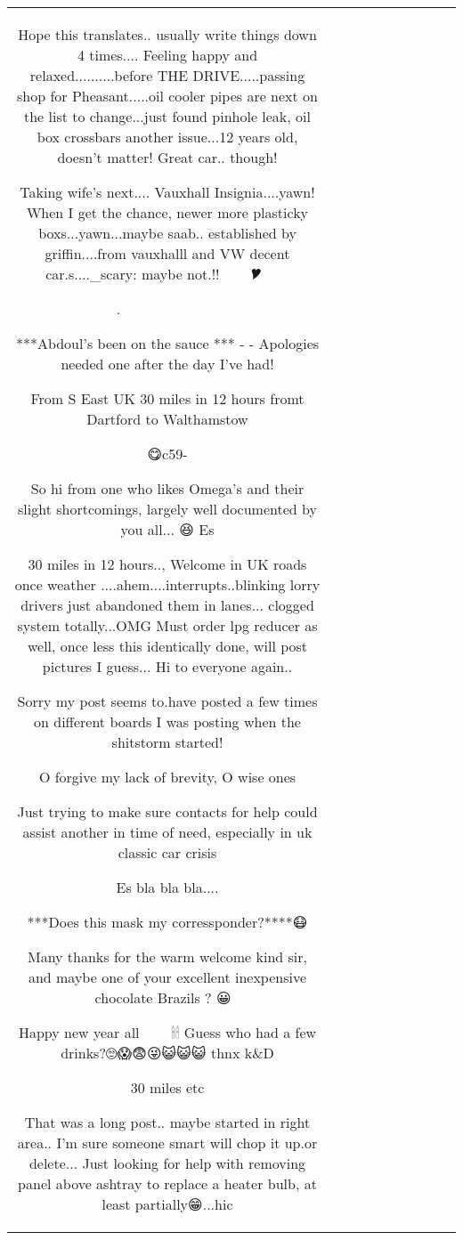 \begin{table}[h!]
\begin{tabular}{|c|c|c|c|c|c|c|c|c|c|}
{Hope this translates.. usually write things down 4 times.... Feeling happy and relaxed..........before THE DRIVE.....passing shop for Pheasant.....oil cooler pipes are next on the list to change...just found pinhole leak, oil box crossbars another issue...12 years old, doesn't matter! Great car.. though! 

Taking wife's next.... Vauxhall Insignia....yawn! When I get the chance, newer more plasticky boxs...yawn...maybe saab..     established by griffin....from vauxhalll and VW decent car.s...._scary: maybe not.!!🎅🎅🎄🎄🎄🎁🎁🎉🎔🎄🎄🎄🎄🎄🎄🎆



 . 🤪😱😈😈 🤒🤒🦑🦑🦆🦆👹👹💀💀🐔🐔🐔🐔 🍾🍾🍾


***Abdoul's been on the sauce  *** - - Apologies needed one after the day I've had! 

From S East UK
30 miles in 12 hours fromt Dartford to Walthamstow

😋c59-


So hi from one who likes Omega's and their slight shortcomings, largely well documented by you all...
😆
Es

30 miles in 12 hours.., Welcome in UK roads once weather ....ahem....interrupts..blinking lorry drivers just abandoned them in lanes... clogged system totally...OMG
Must order lpg reducer as well, once less this identically done, will post pictures I guess...
Hi to everyone again..



Sorry my post seems to.have posted a few times on different boards I was posting when the shitstorm started! 

O forgive my lack of brevity, O wise ones 

Just trying to make sure contacts for help could assist another in time of need, especially in uk classic car crisis 

Es bla bla bla....

***Does this mask my corressponder?****😷

Many thanks for the warm welcome kind sir, and maybe one of your excellent inexpensive chocolate Brazils ? 😀 🎅
 
Happy new year all🎇🎇🎃🥑😱🎂👻🎄🕯🕯
Guess who had a few drinks?🙄😱😨😜😺😺😺 thnx k\&D

30 miles etc



That was a long post.. maybe started in right area.. I'm sure someone smart will chop it up.or delete...
Just looking for help with removing panel above ashtray to replace a heater bulb, at least partially😁...hic

}
\end{tabular}
\end{table}
